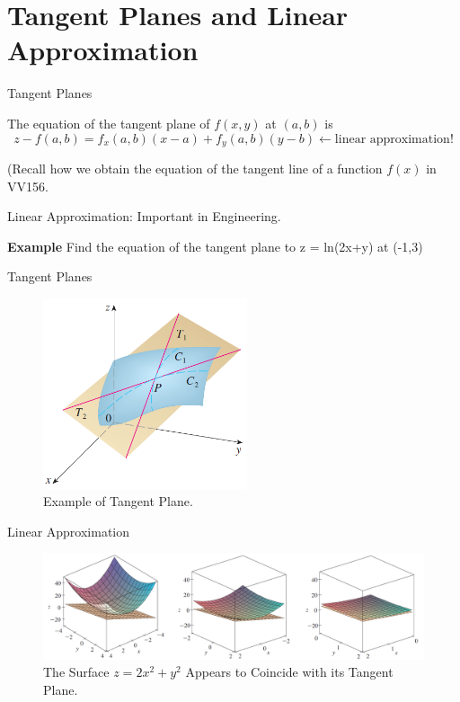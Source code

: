 \documentclass[aspectratio=169, UTF8]{ctexbeamer}
\begin{document}
\section{Tangent Planes and Linear Approximation}
    \begin{frame}[label=6]{Tangent Planes}
        \par The equation of the tangent plane of $f(x,y)$ at $(a,b)$ is 
        \begin{equation*}
            z - f(a,b) = f_x (a,b) (x-a) + f_y (a,b) (y-b) \leftarrow \text{linear approximation!}
        \end{equation*}
        \phantom{zjy}

        \par (Recall how we obtain the equation of the tangent line of a function $f(x)$ in VV156.
        
        \phantom{zjy}
    
        \par Linear Approximation: Important in Engineering.\\
        \par \textbf{Example} Find the equation of the tangent plane to z = ln(2x+y) at (-1,3)
    \end{frame}

    \begin{frame}{Tangent Planes}
        \begin{figure}
            \includegraphics[width = 6cm]{f12}
            \caption{Example of Tangent Plane.}
        \end{figure}
    \end{frame}

    \begin{frame}{Linear Approximation}
        \begin{figure}
            \includegraphics[width = 13cm]{f13}
            \caption{The Surface $z = 2x^2+y^2$ Appears to Coincide with its Tangent Plane.}
        \end{figure}
    \end{frame}
\end{document}

